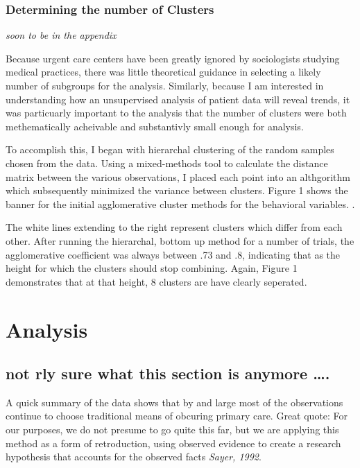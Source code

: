 \documentclass[12pt,twoside]{reedthesis}
\begin{document}
  \subsection{Determining the number of
  Clusters}\label{determining-the-number-of-clusters}
  
  \emph{soon to be in the appendix}
  
  Because urgent care centers have been greatly ignored by sociologists
  studying medical practices, there was little theoretical guidance in
  selecting a likely number of subgroups for the analysis. Similarly,
  because I am interested in understanding how an unsupervised analysis of
  patient data will reveal trends, it was particuarly important to the
  analysis that the number of clusters were both methematically acheivable
  and substantivly small enough for analysis.
  
  To accomplish this, I began with hierarchal clustering of the random
  samples chosen from the data. Using a mixed-methods tool to calculate
  the distance matrix between the various observations, I placed each
  point into an althgorithm which subsequently minimized the variance
  between clusters. Figure 1 shows the banner for the initial
  agglomerative cluster methods for the behavioral variables. .
  
  The white lines extending to the right represent clusters which differ
  from each other. After running the hierarchal, bottom up method for a
  number of trials, the agglomerative coefficient was always between .73
  and .8, indicating that as the height for which the clusters should stop
  combining. Again, Figure 1 demonstrates that at that height, 8 clusters
  are have clearly seperated.
  
  \doublespacing
  
  \chapter{Analysis}\label{analysis}
  
  \section{not rly sure what this section is anymore
  \ldots{}.}\label{not-rly-sure-what-this-section-is-anymore-.}
  
  A quick summary of the data shows that by and large most of the
  observations continue to choose traditional means of obcuring primary
  care. Great quote: For our purposes, we do not presume to go quite this
  far, but we are applying this method as a form of retroduction, using
  observed evidence to create a research hypothesis that accounts for the
  observed facts \emph{Sayer, 1992}.
  
\end{document}
